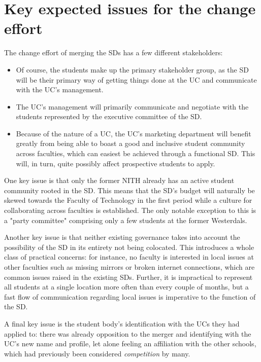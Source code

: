 \section{Key expected issues for the change effort}

The change effort of merging the SDs has a few different stakeholders:

\begin{itemize}
  \item Of course, the students make up the primary stakeholder group, as the SD will be their primary way of getting things done at the UC and communicate with the UC's management.
  \item The UC's management will primarily communicate and negotiate with the students represented by the executive committee of the SD.
  \item Because of the nature of a UC, the UC's marketing department will benefit greatly from being able to boast a good and inclusive student community across faculties, which can easiest be achieved through a functional SD. This will, in turn, quite possibly affect prospective students to apply.
\end{itemize}

One key issue is that only the former NITH already has an active student community rooted in the SD. This means that the SD's budget will naturally be skewed towards the Faculty of Technology in the first period while a culture for collaborating across faculties is established. The only notable exception to this is a "party committee" comprising only a few students at the former Westerdals.

Another key issue is that neither existing governance takes into account the possibility of the SD in its entirety not being colocated. This introduces a whole class of practical concerns: for instance, no faculty is interested in local issues at other faculties such as missing mirrors or broken internet connections, which are common issues raised in the existing SDs. Further, it is impractical to represent all students at a single location more often than every couple of months, but a fast flow of communication regarding local issues is imperative to the function of the SD.

A final key issue is the student body's identification with the UCs they had applied to: there was already opposition to the merger and identifying with the UC's new name and profile, let alone feeling an affiliation with the other schools, which had previously been considered \textit{competition} by many.

